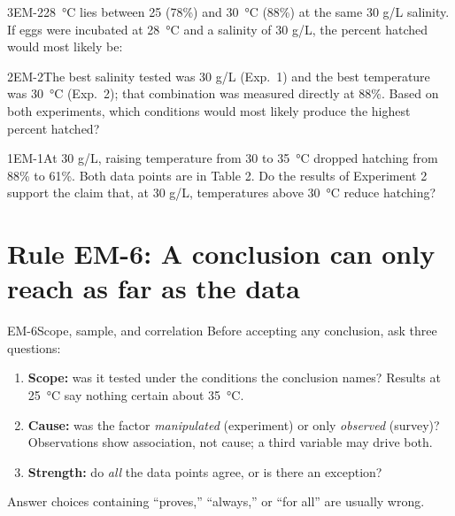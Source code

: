 \documentclass[11pt]{article}
\begin{document}
\begin{q}{3}{EM-2}{\SI{28}{\celsius} lies between 25 (78\%) and \SI{30}{\celsius} (88\%) at the same 30 g/L salinity.}
If eggs were incubated at \SI{28}{\celsius} and a salinity of 30 g/L, the percent hatched would most likely be:
\end{q}

\begin{q}{2}{EM-2}{The best salinity tested was 30 g/L (Exp.\ 1) and the best temperature was \SI{30}{\celsius} (Exp.\ 2); that combination was measured directly at 88\%.}
Based on both experiments, which conditions would most likely produce the highest percent hatched?
\end{q}

\begin{q}{1}{EM-1}{At 30 g/L, raising temperature from 30 to \SI{35}{\celsius} dropped hatching from 88\% to 61\%. Both data points are in Table 2.}
Do the results of Experiment 2 support the claim that, at 30 g/L, temperatures above \SI{30}{\celsius} reduce hatching?
\end{q}

\section{Rule EM-6: A conclusion can only reach as far as the data}

\begin{rulebox}{EM-6}{Scope, sample, and correlation}
Before accepting any conclusion, ask three questions:
\begin{enumerate}
\item \textbf{Scope:} was it tested under the conditions the conclusion names? Results at \SI{25}{\celsius} say nothing certain about \SI{35}{\celsius}.
\item \textbf{Cause:} was the factor \emph{manipulated} (experiment) or only \emph{observed} (survey)? Observations show association, not cause; a third variable may drive both.
\item \textbf{Strength:} do \emph{all} the data points agree, or is there an exception?
\end{enumerate}
Answer choices containing ``proves,'' ``always,'' or ``for all'' are usually wrong.
\end{rulebox}
\end{document}
